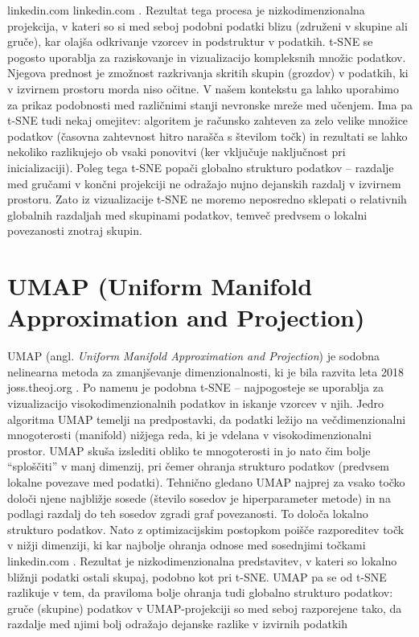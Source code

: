 linkedin.com
linkedin.com
. Rezultat tega procesa je nizkodimenzionalna projekcija, v kateri so si med seboj podobni podatki blizu (združeni v skupine ali gruče), kar olajša odkrivanje vzorcev in podstruktur v podatkih. t-SNE se pogosto uporablja za raziskovanje in vizualizacijo kompleksnih množic podatkov. Njegova prednost je zmožnost razkrivanja skritih skupin (grozdov) v podatkih, ki v izvirnem prostoru morda niso očitne. V našem kontekstu ga lahko uporabimo za prikaz podobnosti med različnimi stanji nevronske mreže med učenjem. Ima pa t-SNE tudi nekaj omejitev: algoritem je računsko zahteven za zelo velike množice podatkov (časovna zahtevnost hitro narašča s številom točk) in rezultati se lahko nekoliko razlikujejo ob vsaki ponovitvi (ker vključuje naključnost pri inicializaciji). Poleg tega t-SNE popači globalno strukturo podatkov – razdalje med gručami v končni projekciji ne odražajo nujno dejanskih razdalj v izvirnem prostoru. Zato iz vizualizacije t-SNE ne moremo neposredno sklepati o relativnih globalnih razdaljah med skupinami podatkov, temveč predvsem o lokalni povezanosti znotraj skupin. \section{UMAP (Uniform Manifold Approximation and Projection)}
UMAP (angl. \textit{Uniform Manifold Approximation and Projection}) je sodobna nelinearna metoda za zmanjševanje dimenzionalnosti, ki je bila razvita leta 2018
joss.theoj.org
. Po namenu je podobna t-SNE – najpogosteje se uporablja za vizualizacijo visokodimenzionalnih podatkov in iskanje vzorcev v njih. Jedro algoritma UMAP temelji na predpostavki, da podatki ležijo na večdimenzionalni mnogoterosti (manifold) nižjega reda, ki je vdelana v visokodimenzionalni prostor. UMAP skuša izslediti obliko te mnogoterosti in jo nato čim bolje “sploščiti” v manj dimenzij, pri čemer ohranja strukturo podatkov (predvsem lokalne povezave med podatki). Tehnično gledano UMAP najprej za vsako točko določi njene najbližje sosede (število sosedov je hiperparameter metode) in na podlagi razdalj do teh sosedov zgradi graf povezanosti. To določa lokalno strukturo podatkov. Nato z optimizacijskim postopkom poišče razporeditev točk v nižji dimenziji, ki kar najbolje ohranja odnose med sosednjimi točkami
linkedin.com
. Rezultat je nizkodimenzionalna predstavitev, v kateri so lokalno bližnji podatki ostali skupaj, podobno kot pri t-SNE. UMAP pa se od t-SNE razlikuje v tem, da praviloma bolje ohranja tudi globalno strukturo podatkov: gruče (skupine) podatkov v UMAP-projekciji so med seboj razporejene tako, da razdalje med njimi bolj odražajo dejanske razlike v izvirnih podatkih
